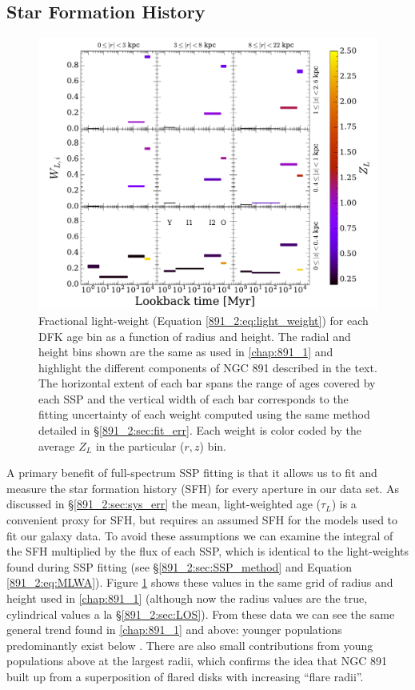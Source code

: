 \subsection{Star Formation History}
\label{891_2:sec:SFH}
\begin{figure}
  \centering
  \includegraphics[width=\textwidth]{891_2/figs/SFH_cuts.pdf}
  \caption[SSP light weights in ($r,|z|$)
    grid]{\fixspacing\label{891_2:fig:SFH_cuts}Fractional light-weight
    (Equation \ref{891_2:eq:light_weight}) for each DFK age bin as a
    function of radius and height. The radial and height bins shown
    are the same as used in \ref{chap:891_1} and highlight the
    different components of NGC 891 described in the text. The
    horizontal extent of each bar spans the range of ages covered by
    each SSP and the vertical width of each bar corresponds to the
    fitting uncertainty of each weight computed using the same method
    detailed in \S\ref{891_2:sec:fit_err}. Each weight is color coded
    by the average $Z_L$ in the particular ($r,z$) bin.  }

\end{figure}

A primary benefit of full-spectrum SSP fitting is that it allows us to
fit and measure the star formation history (SFH) for every aperture in
our data set. As discussed in \S\ref{891_2:sec:sys_err} the mean,
light-weighted age ($\tau_L$) is a convenient proxy for SFH, but
requires an assumed SFH for the models used to fit our galaxy data. To
avoid these assumptions we can examine the integral of the SFH
multiplied by the flux of each SSP, which is identical to the
light-weights found during SSP fitting (see
\S\ref{891_2:sec:SSP_method} and Equation \ref{891_2:eq:MLWA}). Figure
\ref{891_2:fig:SFH_cuts} shows these values in the same grid of radius
and height used in \ref{chap:891_1} (although now the radius values
are the true, cylindrical values a la \S\ref{891_2:sec:LOS}). From
these data we can see the same general trend found in \ref{chap:891_1}
and above: younger populations predominantly exist below
. There are also small contributions from young
populations above  at the largest radii, which confirms
the idea that NGC 891 built up from a superposition of flared disks
with increasing ``flare radii''.

